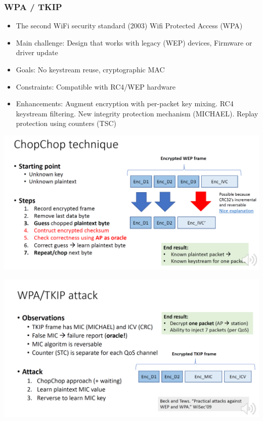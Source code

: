 \subsubsection{WPA / TKIP}

\begin{itemize}
    \item The second WiFi security standard (2003) Wifi Protected Access (WPA)
    \item Main challenge: Design that works with legacy (WEP) devices, Firmware or driver update
    \item Goals: No keystream reuse, cryptographic MAC
    \item Constraints: Compatible with RC4/WEP hardware
    \item Enhancements: Augment encryption with per-packet key mixing. RC4 keystream filtering. New integrity protection mechanism (MICHAEL). Replay protection using counters (TSC)
\end{itemize}

\begin{minipage}{\linewidth}
    \centering      
    \includegraphics[width=\linewidth]{Figures/L9_chop_chop.PNG}
\end{minipage}

\begin{minipage}{\linewidth}
    \centering      
    \includegraphics[width=\linewidth]{Figures/L9_wpa_attack.PNG}
\end{minipage}

